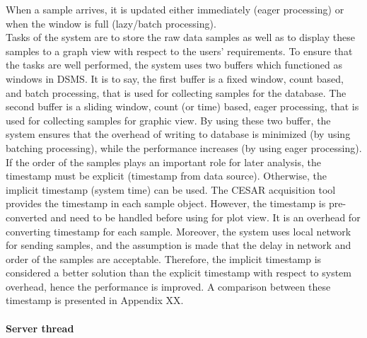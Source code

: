 When a sample arrives, it is updated either immediately (eager processing) or when the window is full (lazy/batch processing).\\
Tasks of the system are to store the raw data samples as well as to display these samples to a graph view with respect to the users’ requirements. To ensure that the tasks are well performed, the system uses two buffers which functioned as windows in DSMS. It is to say, the first buffer is a fixed window, count based, and batch processing, that is used for collecting samples for the database. The second buffer is a sliding window, count (or time) based, eager processing, that is used for collecting samples for graphic view. By using these two buffer, the system ensures that the overhead of writing to database is minimized (by using batching processing), while the performance increases (by using eager processing).\\
If the order of the samples plays an important role for later analysis, the timestamp must be explicit (timestamp from data source). Otherwise, the implicit timestamp (system time) can be used. The CESAR acquisition tool provides the timestamp in each sample object. However, the timestamp is pre-converted and need to be handled before using for plot view. It is an overhead for converting timestamp for each sample. Moreover, the system uses local network for sending samples, and the assumption is made that the delay in network and order of the samples are acceptable. Therefore, the implicit timestamp is considered a better solution than the explicit timestamp with respect to system overhead, hence the performance is improved. A comparison between these timestamp is presented in Appendix XX.\\\\
\textbf{Server thread}\\
